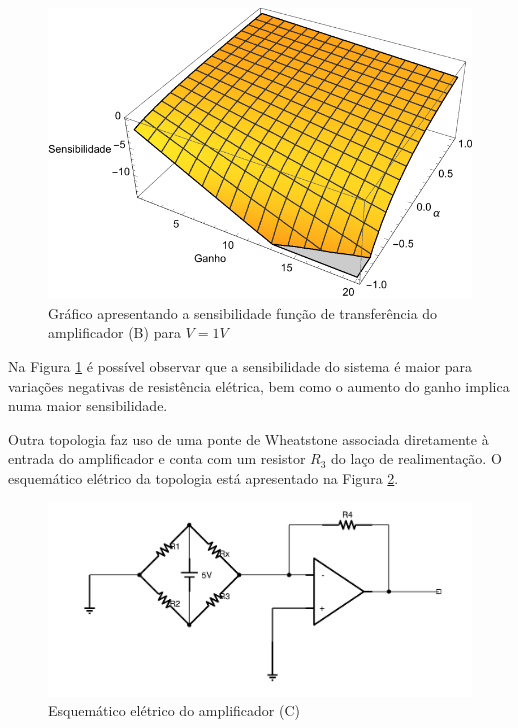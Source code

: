 \documentclass[a4paper]{instrumentacao}
\begin{document}
\begin{figure}[H]
\center
\includegraphics[width=\textwidth]{Amplificador-B-Sensibility.pdf}
\caption{Gráfico apresentando a sensibilidade função de transferência do amplificador (B) para $V=1V$}
\label{fig:amplificador-b-sensibilidade}
\end{figure}

Na Figura \ref{fig:amplificador-b-sensibilidade} é possível observar que a sensibilidade do sistema é maior para variações negativas de resistência elétrica, bem como o aumento do ganho implica numa maior sensibilidade.


Outra topologia faz uso de uma ponte de Wheatstone associada diretamente à entrada do amplificador e conta com um resistor $R_3$ do laço de realimentação. O esquemático elétrico da topologia está apresentado na Figura \ref{fig:amplificador-c}.

\begin{figure}[H]
\center
\includegraphics[width=\textwidth]{Amplificador-C.pdf}
\caption{Esquemático elétrico do amplificador (C)}
\label{fig:amplificador-c}
\end{figure}
\end{document}
